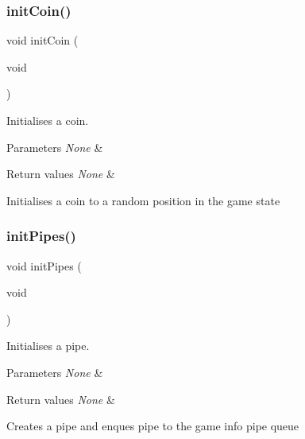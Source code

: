 \subsubsection{\texorpdfstring{init\+Coin()}{initCoin()}}
{\footnotesize\ttfamily void init\+Coin (\begin{DoxyParamCaption}\item[{void}]{ }\end{DoxyParamCaption})}



Initialises a coin. 


\begin{DoxyParams}{Parameters}
{\em None} & \\
\hline
\end{DoxyParams}

\begin{DoxyRetVals}{Return values}
{\em None} & \\
\hline
\end{DoxyRetVals}
Initialises a coin to a random position in the game state \mbox{\label{group___flappy___bird_ga1e02da6e4d86847797f3b06dd1f6e76c}} 
\subsubsection{\texorpdfstring{init\+Pipes()}{initPipes()}}
{\footnotesize\ttfamily void init\+Pipes (\begin{DoxyParamCaption}\item[{void}]{ }\end{DoxyParamCaption})}



Initialises a pipe. 


\begin{DoxyParams}{Parameters}
{\em None} & \\
\hline
\end{DoxyParams}

\begin{DoxyRetVals}{Return values}
{\em None} & \\
\hline
\end{DoxyRetVals}
Creates a pipe and enques pipe to the game info pipe queue \mbox{\label{group___flappy___bird_ga332be568448526bd288ccd321978fb1b}} 
